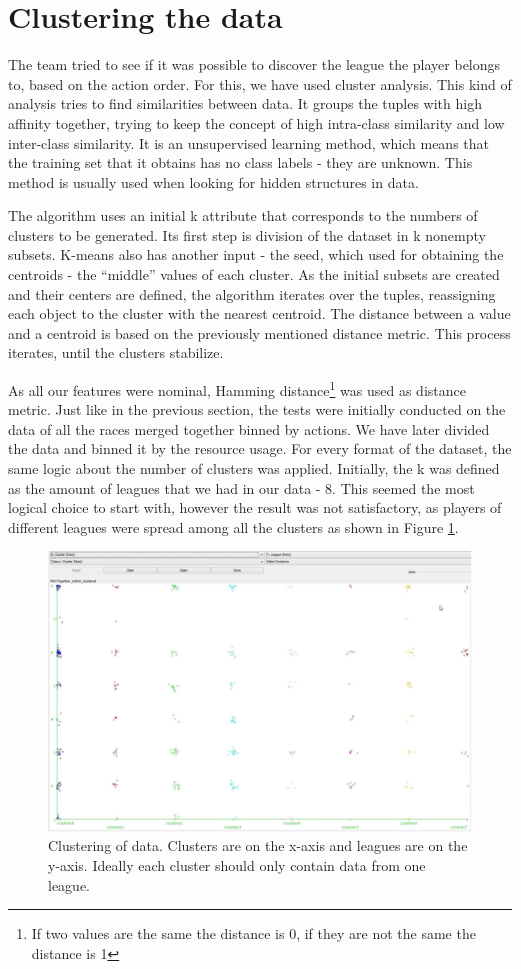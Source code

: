 \documentclass[a4paper,11pt]{article}
\begin{document}
\section{Clustering the data}
The team tried to see if it was possible to discover the league the player belongs to, based on the action order. For this, we have used cluster analysis. This kind of analysis tries to find similarities between data. It groups the tuples with high affinity together, trying to keep the concept of high intra-class similarity and low inter-class similarity. It is an unsupervised learning method, which means that the training set that it obtains has no class labels - they are unknown. This method is usually used when looking for hidden structures in data.

The algorithm uses an initial k attribute that corresponds to the numbers of clusters to be generated. Its first step is division of the dataset in k nonempty subsets. K-means also has another input - the seed, which used for obtaining the centroids - the “middle” values of each cluster. As the initial subsets are created and their centers are defined, the algorithm iterates over the tuples, reassigning each object to the cluster with the nearest centroid. The distance between a value and a centroid is based on the previously mentioned distance metric. This process iterates, until the clusters stabilize.

As all our features were nominal, Hamming distance\footnote{If two values are the same the distance is 0, if they are not the same the distance is 1} was used as distance metric.
Just like in the previous section, the tests were initially conducted on the data of all the races merged together binned by actions. We have later divided the data and binned it by the resource usage.
For every format of the dataset, the same logic about the number of clusters was applied. Initially, the k was defined as the amount of leagues that we had in our data - 8. This seemed the most logical choice to start with, however the result was not satisfactory, as players of different leagues were spread among all the clusters as shown in Figure \ref{fig:cluster-8}.
\begin{figure}[H]
\centering
  \includegraphics[width=.95\linewidth]{cluster-8}
\caption{Clustering of data. Clusters are on the x-axis and leagues are on the y-axis. Ideally each cluster should only contain data from one league.}
\label{fig:cluster-8}
\end{figure}
\end{document}

